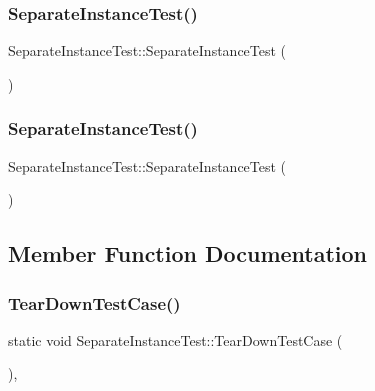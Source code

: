 \subsubsection{\texorpdfstring{SeparateInstanceTest()}{SeparateInstanceTest()}\hspace{0.1cm}{\footnotesize\ttfamily [2/3]}}
{\footnotesize\ttfamily Separate\+Instance\+Test\+::\+Separate\+Instance\+Test (\begin{DoxyParamCaption}{ }\end{DoxyParamCaption})\hspace{0.3cm}{\ttfamily [inline]}}

\mbox{\label{class_separate_instance_test_a50a822b67bbc10d44701d213c2849b09}} 
\subsubsection{\texorpdfstring{SeparateInstanceTest()}{SeparateInstanceTest()}\hspace{0.1cm}{\footnotesize\ttfamily [3/3]}}
{\footnotesize\ttfamily Separate\+Instance\+Test\+::\+Separate\+Instance\+Test (\begin{DoxyParamCaption}{ }\end{DoxyParamCaption})\hspace{0.3cm}{\ttfamily [inline]}}



\subsection{Member Function Documentation}
\mbox{\label{class_separate_instance_test_a7c4a72843a7c4a9be56adef27ecd33c7}} 
\subsubsection{\texorpdfstring{TearDownTestCase()}{TearDownTestCase()}}
{\footnotesize\ttfamily static void Separate\+Instance\+Test\+::\+Tear\+Down\+Test\+Case (\begin{DoxyParamCaption}{ }\end{DoxyParamCaption})\hspace{0.3cm}{\ttfamily [inline]}, {\ttfamily [static]}}

